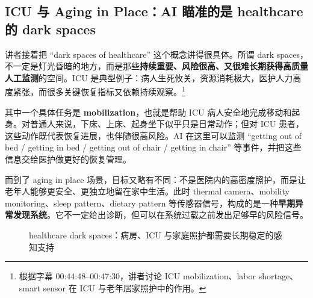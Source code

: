 \documentclass[a4paper]{article}
\begin{document}
\subsection{ICU 与 Aging in Place：AI 瞄准的是 healthcare 的 dark spaces}

讲者接着把 ``dark spaces of healthcare'' 这个概念讲得很具体。所谓 dark spaces，不一定是灯光昏暗的地方，而是那些\textbf{持续重要、风险很高、又很难长期获得高质量人工监测}的空间。ICU 是典型例子：病人生死攸关，资源消耗极大，医护人力高度紧张，而很多关键恢复指标又依赖持续观察。\footnote{根据字幕 00:44:48--00:47:30，讲者讨论 ICU mobilization、labor shortage、smart sensor 在 ICU 与老年居家照护中的作用。}

其中一个具体任务是 \textbf{mobilization}，也就是帮助 ICU 病人安全地完成移动和起身。对普通人来说，下床、上床、起身坐下似乎只是日常动作；但对 ICU 患者，这些动作既代表恢复进展，也伴随很高风险。AI 在这里可以监测 ``getting out of bed / getting in bed / getting out of chair / getting in chair'' 等事件，并把这些信息交给医护做更好的恢复管理。

而到了 aging in place 场景，目标又略有不同：不是医院内的高密度照护，而是让老年人能够更安全、更独立地留在家中生活。此时 thermal camera、mobility monitoring、sleep pattern、dietary pattern 等传感器信号，构成的是一种\textbf{早期异常发现系统}。它不一定给出诊断，但可以在系统过载之前发出足够早的风险信号。

\begin{figure}[H]
\centering
{}
\caption{healthcare dark spaces：病房、ICU 与家庭照护都需要长期稳定的感知支持}
\end{figure}
\end{document}
